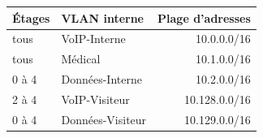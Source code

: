     \begin{center}
        \begin{tabular}{|l|l|r|}
          \hline
            Étages  &   VLAN interne    &   Plage d'adresses \\
          \hline
            tous    &   VoIP-Interne    &   10.0.0.0/16 \\
          \hline
            tous    &   Médical         &   10.1.0.0/16 \\
          \hline
            0 à 4   &   Données-Interne &   10.2.0.0/16 \\
          \hline
            2 à 4   &   VoIP-Visiteur   &   10.128.0.0/16 \\
          \hline
            0 à 4   &  Données-Visiteur &   10.129.0.0/16 \\
          \hline
        \end{tabular}
    \end{center}

%
%
